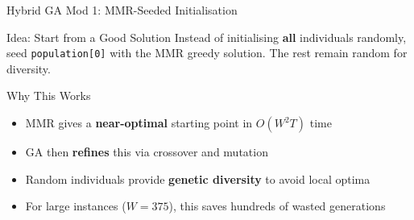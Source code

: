 \documentclass[aspectratio=169,10pt]{beamer}
\begin{document}
\begin{frame}[shrink=5]{Hybrid GA Mod 1: MMR-Seeded Initialisation}

  \begin{block}{Idea: Start from a Good Solution}
    \small
    Instead of initialising \textbf{all} individuals randomly, seed
    \texttt{population[0]} with the MMR greedy solution.
    The rest remain random for diversity.
  \end{block}

  \vspace{0.15cm}

  \begin{center}
  \end{center}

  \vspace{0.12cm}

  \begin{exampleblock}{Why This Works}
    \small
    \begin{itemize}\setlength\itemsep{2pt}
      \item[\color{goldaccent}$\blacktriangleright$]
        MMR gives a \textbf{near-optimal} starting point in $O(W^2T)$ time
      \item[\color{goldaccent}$\blacktriangleright$]
        GA then \textbf{refines} this via crossover and mutation
      \item[\color{goldaccent}$\blacktriangleright$]
        Random individuals provide \textbf{genetic diversity} to avoid local optima
      \item[\color{goldaccent}$\blacktriangleright$]
        For large instances ($W=375$), this saves hundreds of wasted generations
    \end{itemize}
  \end{exampleblock}

\end{frame}
\end{document}
